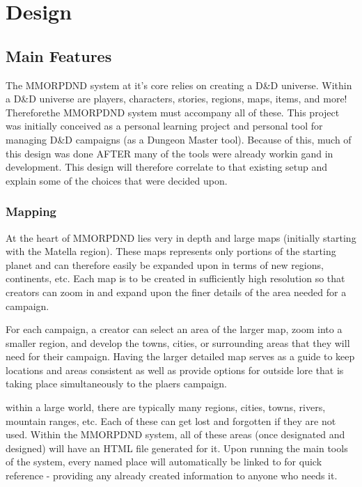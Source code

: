 \chapter{Design}

\section{Main Features}

The MMORPDND system at it's core relies on creating a D\&D universe. Within a D\&D universe are players, characters, stories, regions, maps, items, and more! Thereforethe MMORPDND system must accompany all of these. This project was initially conceived as a personal learning project and personal tool for managing D\&D campaigns (as a Dungeon Master tool). Because of this, much of this design was done AFTER many of the tools were already workin gand in development. This design will therefore correlate to that existing setup and explain some of the choices that were decided upon.

\subsection{Mapping}

At the heart of MMORPDND lies very in depth and large maps (initially starting with the Matella region). These maps represents only portions of the starting planet and can therefore easily be expanded upon in terms of new regions, continents, etc. Each map is to be created in sufficiently high resolution so that creators can zoom in and expand upon the finer details of the area needed for a campaign.

For each campaign, a creator can select an area of the larger map, zoom into a smaller region, and develop the towns, cities, or surrounding areas that they will need for their campaign. Having the larger detailed map serves as a guide to keep locations and areas consistent as well as provide options for outside lore that is taking place simultaneously to the plaers campaign.

within a large world, there are typically many regions, cities, towns, rivers, mountain ranges, etc. Each of these can get lost and forgotten if they are not used. Within the MMORPDND system, all of these areas (once designated and designed) will have an HTML file generated for it. Upon running the main tools of the system, every named place will automatically be linked to for quick reference - providing any already created information to anyone who needs it.

